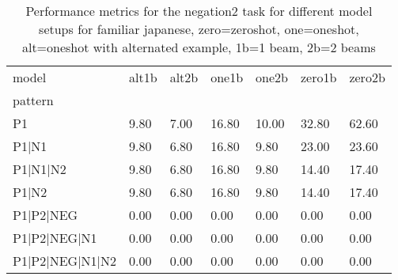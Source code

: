 \begin{table}[h]
\begin{tabular}{l|llllll}
\toprule
model & alt1b & alt2b & one1b & one2b & zero1b & zero2b \\
pattern &  &  &  &  &  &  \\
\midrule
P1 & 9.80 & 7.00 & 16.80 & 10.00 & 32.80 & 62.60 \\
P1|N1 & 9.80 & 6.80 & 16.80 & 9.80 & 23.00 & 23.60 \\
P1|N1|N2 & 9.80 & 6.80 & 16.80 & 9.80 & 14.40 & 17.40 \\
P1|N2 & 9.80 & 6.80 & 16.80 & 9.80 & 14.40 & 17.40 \\
P1|P2|NEG & 0.00 & 0.00 & 0.00 & 0.00 & 0.00 & 0.00 \\
P1|P2|NEG|N1 & 0.00 & 0.00 & 0.00 & 0.00 & 0.00 & 0.00 \\
P1|P2|NEG|N1|N2 & 0.00 & 0.00 & 0.00 & 0.00 & 0.00 & 0.00 \\
\bottomrule
\end{tabular}
\caption{Performance metrics for the negation2 task for different model setups for familiar japanese, zero=zeroshot, one=oneshot, alt=oneshot with alternated example, 1b=1 beam, 2b=2 beams}
\label{tab:ja fam_negation2_performance}
\end{table}
